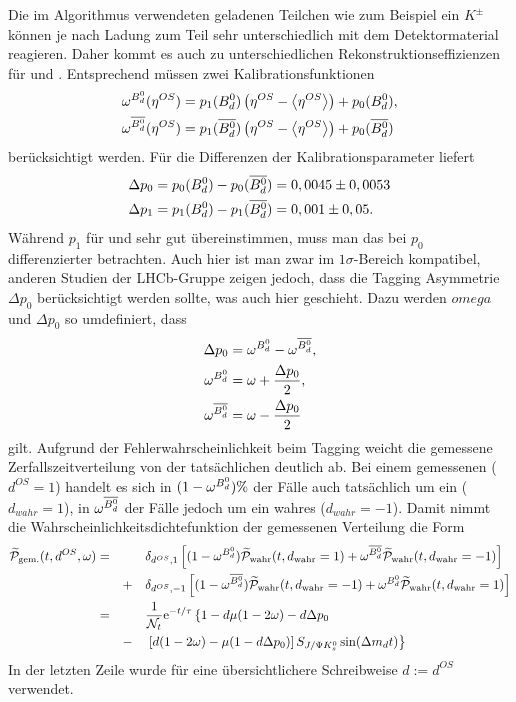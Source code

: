Die im Algorithmus verwendeten geladenen Teilchen wie zum Beispiel ein $K^{\pm}$ können je nach Ladung zum Teil sehr unterschiedlich mit dem Detektormaterial reagieren. Daher kommt es auch zu unterschiedlichen Rekonstruktionseffizienzen für \Bd und \Bdbar. Entsprechend müssen zwei Kalibrationsfunktionen 
\begin{align}
\omega^{\text{$B_d^0$}}(\eta^{OS}) &= p_1(\text{$B_d^0$})\left(\eta^{OS}-\left\langle \eta^{OS} \right\rangle\right) + p_0(\text{$B_d^0$}) , \\
\omega^{\text{$\overline{B_d^0}$}}(\eta^{OS}) &= p_1(\text{$\overline{B_d^0}$})\left(\eta^{OS}-\left\langle \eta^{OS} \right\rangle\right) + p_0(\text{$\overline{B_d^0}$})
\end{align}
berücksichtigt werden. Für die Differenzen der Kalibrationsparameter liefert \cite{tagging}
\begin{align}
\Delta p_0 &= p_0(\text{$B_d^0$}) - p_0(\text{$\overline{B_d^0}$}) = 0,0045 \pm 0,0053 \\
\Delta p_1 &= p_1(\text{$B_d^0$}) - p_1(\text{$\overline{B_d^0}$}) = 0,001 \pm 0,05 .
\end{align}
Während $p_1$ für \Bd und \Bdbar sehr gut übereinstimmen, muss man das bei $p_0$ differenzierter betrachten. Auch hier ist man zwar im $1\sigma$-Bereich kompatibel, anderen Studien der LHCb-Gruppe zeigen jedoch, dass die Tagging Asymmetrie $\Delta p_0$ berücksichtigt werden sollte, was auch hier geschieht. Dazu werden $omega$ und $\Delta p_0$ so umdefiniert, dass
\begin{align}
\Delta p_0 &= \omega^{\text{$B_d^0$}} - \omega^{\text{$\overline{B_d^0}$}}, \\
\omega^{\text{$B_d^0$}} &= \omega + \frac{\Delta p_0}{2},  \\
\omega^{\text{$\overline{B_d^0}$}} &= \omega - \frac{\Delta p_0}{2}
\end{align}
gilt. Aufgrund der Fehlerwahrscheinlichkeit beim Tagging weicht die gemessene Zerfallszeitverteilung von der tatsächlichen deutlich ab. Bei einem gemessenen \Bd ($d^{OS}=1$) handelt es sich in $(1-\omega^{\text{$B_d^0$}})\%$ der Fälle auch tatsächlich um ein \Bd ($d_{wahr}=1$), in $\omega^{\text{$\overline{B_d^0}$}}$ der Fälle jedoch um ein wahres \Bdbar ($d_{wahr}=-1$). Damit nimmt die Wahrscheinlichkeitsdichtefunktion der gemessenen Verteilung die Form
\begin{alignat}{3}
\nonumber\widetilde{\mathcal{P}}_{\text{gem.}}(t, d^{OS}, \omega) &= && &&\delta_{d^{OS},1} \left[(1-\omega^{\text{$B_d^0$}})\widetilde{\mathcal{P}}_{\text{wahr}}(t, d_{\text{wahr}}=1) + \omega^{\text{$\overline{B_d^0}$}}\widetilde{\mathcal{P}}_{\text{wahr}}(t, d_{\text{wahr}}=-1)\right]\\
\nonumber & && + &&\delta_{d^{OS},-1} \left[(1-\omega^{\text{$\overline{B_d^0}$}})\widetilde{\mathcal{P}}_{\text{wahr}}(t, d_{\text{wahr}}=-1) + \omega^{\text{$B_d^0$}}\widetilde{\mathcal{P}}_{\text{wahr}}(t, d_{\text{wahr}}=1)\right] \\
\nonumber &= && &&\frac{1}{\mathcal{N}_t}\mathrm{e}^{-t/\tau} \left\lbrace 1-d\mu(1-2\omega)-d\Delta p_0 \right. \\
& && - && \left.\left[d(1-2\omega)-\mu(1-d\Delta p_0)\right]S_{J/\Psi K_s^0}\sin(\Delta m_d t)\right\rbrace \label{eq:fit_pdf_vorlaeufig}
\end{alignat}
In der letzten Zeile wurde für eine übersichtlichere Schreibweise $d:=d^{OS}$ verwendet.


